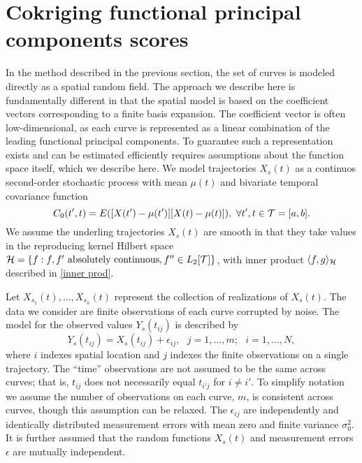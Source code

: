 \section{Cokriging functional principal components scores} %
\label{sec:cokriging_functional_principal_compents_scores}
In the method described in the previous section, the set of curves is modeled directly as a spatial random field. The approach we describe here is fundamentally different in that the spatial model is based on the coefficient vectors corresponding to a finite basis expansion. The coefficient vector is often low-dimensional, as each curve is represented as a linear combination of the leading functional principal components. To guarantee such a representation exists and can be estimated efficiently requires assumptions about the function space itself, which we describe here. 
  We model trajectories $X_s(t)$ as a continuos second-order stochastic process with mean $\mu(t)$ and bivariate temporal covariance function
\begin{equation}
	C_{0}(t',t)=E([X(t')-\mu(t')][X(t)-\mu(t)]),\mbox{ }\forall t',t\in \mathcal{T}=[a,b]. 
\end{equation} 
 We assume the underling trajectories $X_s(t)$ are smooth in that they take values in the reproducing kernel Hilbert space $\mathcal{H}= \{f : f, f' \mbox{ absolutely continuous}, f'' \in L_2[\mathcal{T}]\}$, with inner product $\langle f, g \rangle_{\mathcal{H}}$ described in \eqref{inner prod}.

Let $X_{s_1}(t), \dots, X_{s_n}(t)$ represent the collection of realizations of $X_s(t)$. The data we consider are finite observations of each curve corrupted by noise. The model for the observed values $Y_s(t_{ij})$ is described by
\begin{equation}
	Y_s(t_{ij})=X_s(t_{ij})+\epsilon_{ij},\mbox{ }j=1,\dots,m;\mbox{ }i=1,\dots,N, \label{kriging:observation model}
\end{equation} 
where $i$ indexes spatial location and $j$ indexes the finite observations on a single trajectory. The ``time'' observations are not assumed to be the same across curves; that is, $t_{ij}$ does not necessarily equal $t_{i'j}$ for $i \neq i'$. To simplify notation we assume the number of observations on each curve, $m$, is consistent across curves, though this assumption can be relaxed. The $\epsilon_{ij}$ are independently and identically distributed measurement errors with mean zero and finite variance $\sigma_{0}^{2}.$ It is further assumed that the random functions $X_s(t)$ and measurement errors $\epsilon$ are mutually independent. 

